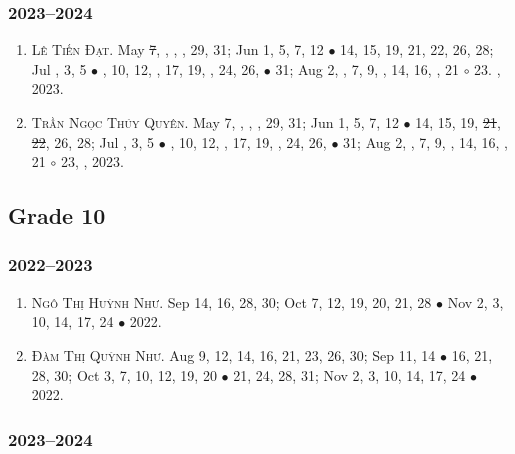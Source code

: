 \documentclass{article}
\begin{document}
\subsubsection{2023--2024}

\begin{enumerate}
	\item \textsc{Lê Tiến Đạt.} May \st{7}, , , , 29, 31; Jun 1, 5, 7, 12 $\bullet$ 14, 15, 19, 21, 22, 26, 28; Jul , 3, 5 $\bullet$ , 10, 12, , 17, 19, , 24, 26,  $\bullet$ 31; Aug 2, , 7, 9, , 14, 16, , 21 $\circ$ 23. , 2023.
	\item \textsc{Trần Ngọc Thúy Quyên.} May 7, , , , 29, 31; Jun 1, 5, 7, 12 $\bullet$ 14, 15, 19, \st{21}, \st{22}, 26, 28; Jul , 3, 5 $\bullet$ , 10, 12, , 17, 19, , 24, 26,  $\bullet$ 31; Aug 2, , 7, 9, , 14, 16, , 21 $\circ$ 23, , 2023.
\end{enumerate}


\subsection{Grade 10}

\subsubsection{2022--2023}

\begin{enumerate}
	\item \textsc{Ngô Thị Huỳnh Như.} {\sf[In]} Sep 14, 16, 28, 30; Oct 7, 12, 19, 20, 21, 28 $\bullet$ Nov 2, 3, 10, 14, 17, 24 $\bullet$ 2022. {\sf[Out]}
	\item \textsc{Đàm Thị Quỳnh Như.} {\sf[In]} Aug 9, 12, 14, 16, 21, 23, 26, 30; Sep 11, 14 $\bullet$ 16, 21, 28, 30; Oct 3, 7, 10, 12, 19, 20 $\bullet$ 21, 24, 28, 31; Nov 2, 3, 10, 14, 17, 24 $\bullet$ 2022. {\sf[Out]}
\end{enumerate}

\subsubsection{2023--2024}

\end{document}
